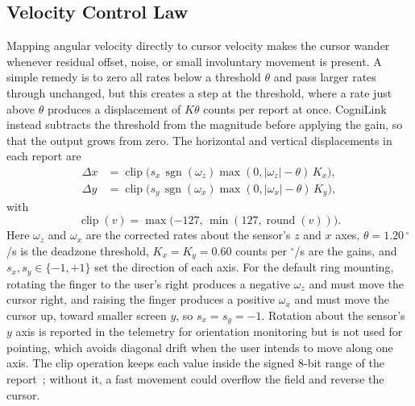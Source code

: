 \documentclass[journal]{IEEEtran}
\newcommand{\dps}{\ensuremath{^{\circ}}/s}
\begin{document}
\subsection{Velocity Control Law}
\label{sec:law}
Mapping angular velocity directly to cursor velocity makes the cursor wander whenever residual offset, noise, or small involuntary movement is present. A simple remedy is to zero all rates below a threshold $\theta$ and pass larger rates through unchanged, but this creates a step at the threshold, where a rate just above $\theta$ produces a displacement of $K\theta$ counts per report at once. CogniLink instead subtracts the threshold from the magnitude before applying the gain, so that the output grows from zero. The horizontal and vertical displacements in each report are
\begin{align}
\Delta x&=\operatorname{clip}\!\big(s_x\,\operatorname{sgn}(\omega_z)\max(0,|\omega_z|-\theta)\,K_x\big), \label{eq:dx}\\
\Delta y&=\operatorname{clip}\!\big(s_y\,\operatorname{sgn}(\omega_x)\max(0,|\omega_x|-\theta)\,K_y\big), \label{eq:dy}
\end{align}
with
\begin{equation}
\operatorname{clip}(v)=\max\!\big({-127},\,\min(127,\operatorname{round}(v))\big).
\label{eq:clip}
\end{equation}
Here $\omega_z$ and $\omega_x$ are the corrected rates about the sensor's $z$ and $x$ axes, $\theta=1.20$\,\dps{} is the deadzone threshold, $K_x=K_y=0.60$ counts per \dps{} are the gains, and $s_x,s_y\in\{-1,+1\}$ set the direction of each axis. For the default ring mounting, rotating the finger to the user's right produces a negative $\omega_z$ and must move the cursor right, and raising the finger produces a positive $\omega_x$ and must move the cursor up, toward smaller screen $y$, so $s_x=s_y=-1$. Rotation about the sensor's $y$ axis is reported in the telemetry for orientation monitoring but is not used for pointing, which avoids diagonal drift when the user intends to move along one axis. The clip operation keeps each value inside the signed 8-bit range of the report~\cite{usbhid}; without it, a fast movement could overflow the field and reverse the cursor.
\end{document}
